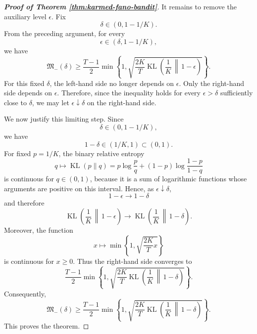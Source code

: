 \documentclass[journal]{IEEEtran}
\newcommand{\KL}{\operatorname{KL}}
\begin{document}
\begin{proof}[\textbf{Proof of Theorem \ref{thm:karmed-fano-bandit}}]
It remains to remove the auxiliary level \(\epsilon\). Fix
\[
\delta\in(0,1-1/K).
\]
From the preceding argument, for every
\[
\epsilon\in(\delta,1-1/K),
\]
we have
\[
\mathfrak M_-(\delta)
\ge
\frac{T-1}{2}
\min\left\{
1,
\sqrt{
\frac{2K}{T}
\KL\left(\frac1K\,\middle\|\,1-\epsilon\right)
}
\right\}.
\]
For this fixed \(\delta\), the left-hand side no longer depends on
\(\epsilon\). Only the right-hand side depends on \(\epsilon\). Therefore, since
the inequality holds for every \(\epsilon>\delta\) sufficiently close to
\(\delta\), we may let \(\epsilon\downarrow\delta\) on the right-hand side.

We now justify this limiting step. Since
\[
\delta\in(0,1-1/K),
\]
we have
\[
1-\delta\in(1/K,1)\subset(0,1).
\]
For fixed \(p=1/K\), the binary relative entropy
\[
q\mapsto \KL(p\|q)
=
p\log\frac{p}{q}
+
(1-p)\log\frac{1-p}{1-q}
\]
is continuous for \(q\in(0,1)\), because it is a sum of logarithmic functions
whose arguments are positive on this interval. Hence, as
\(\epsilon\downarrow\delta\),
\[
1-\epsilon\to 1-\delta
\]
and therefore
\[
\KL\left(\frac1K\,\middle\|\,1-\epsilon\right)
\to
\KL\left(\frac1K\,\middle\|\,1-\delta\right).
\]
Moreover, the function
\[
x\mapsto
\min\left\{
1,
\sqrt{\frac{2K}{T}x}
\right\}
\]
is continuous for \(x\ge0\). Thus the right-hand side converges to
\[
\frac{T-1}{2}
\min\left\{
1,
\sqrt{
\frac{2K}{T}
\KL\left(\frac1K\,\middle\|\,1-\delta\right)
}
\right\}.
\]
Consequently,
\[
\mathfrak M_-(\delta)
\ge
\frac{T-1}{2}
\min\left\{
1,
\sqrt{
\frac{2K}{T}
\KL\left(\frac1K\,\middle\|\,1-\delta\right)
}
\right\}.
\]
This proves the theorem.
\end{proof}
\end{document}
